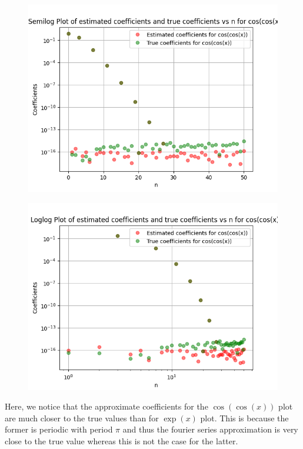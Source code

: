 \documentclass[11pt, a4paper]{article}
\begin{document}
\begin{figure}[H]
     \centering
     \includegraphics[scale=0.8]{Figure_9.png}
\end{figure}


\begin{figure}[H]
     \centering
     \includegraphics[scale=0.8]{Figure_10.png}
\end{figure}


Here, we notice that the approximate coefficients for the $\cos(\cos(x))$ plot are much closer to the true values than for $\exp(x)$ plot. This is because the former is periodic with period $\pi$ and thus the fourier series approximation is very close to the true value whereas this is not the case for the latter.
\end{document}
